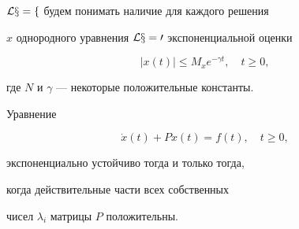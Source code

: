 $\cal L x = f$ будем понимать наличие для каждого решения


$x$ однородного уравнения $\cal L x = 0$ экспоненциальной оценки


\begin{equation}


|x(t)| \le M_xe^{-\gamma t},\quad t \ge 0,


\end{equation}


где $N$ и $\gamma$ --- некоторые положительные константы.





\begin{priz} Уравнение


\begin{equation}


\Dot x(t)+Px(t)=f(t),\quad t\ge 0,


\end{equation}


экспоненциально устойчиво тогда и только тогда,


когда действительные части всех собственных


чисел $\lambda_i$ матрицы $P$ положительны.


\end{priz}





